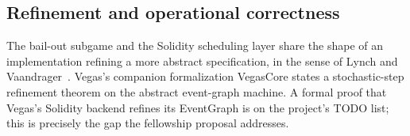 \subsection{Refinement and operational correctness}

The bail-out subgame and the Solidity scheduling layer share
the shape of an implementation refining a more abstract
specification, in the sense of Lynch and
Vaandrager~\citep{LynchVaandrager1995}.  Vegas's companion
formalization VegasCore states a stochastic-step refinement
theorem on the abstract event-graph machine.  A formal proof
that Vegas's Solidity backend refines its EventGraph is on the
project's TODO list; this is precisely the gap the fellowship
proposal addresses.
